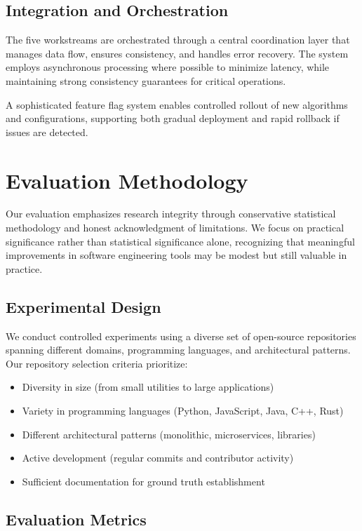 \documentclass[conference]{IEEEtran}
\begin{document}
\subsection{Integration and Orchestration}

The five workstreams are orchestrated through a central coordination layer that manages data flow, ensures consistency, and handles error recovery. The system employs asynchronous processing where possible to minimize latency, while maintaining strong consistency guarantees for critical operations.

A sophisticated feature flag system enables controlled rollout of new algorithms and configurations, supporting both gradual deployment and rapid rollback if issues are detected.

\section{Evaluation Methodology}

Our evaluation emphasizes research integrity through conservative statistical methodology and honest acknowledgment of limitations. We focus on practical significance rather than statistical significance alone, recognizing that meaningful improvements in software engineering tools may be modest but still valuable in practice.

\subsection{Experimental Design}

We conduct controlled experiments using a diverse set of open-source repositories spanning different domains, programming languages, and architectural patterns. Our repository selection criteria prioritize:

\begin{itemize}
\item Diversity in size (from small utilities to large applications)
\item Variety in programming languages (Python, JavaScript, Java, C++, Rust)
\item Different architectural patterns (monolithic, microservices, libraries)
\item Active development (regular commits and contributor activity)
\item Sufficient documentation for ground truth establishment
\end{itemize}

\subsection{Evaluation Metrics}
\end{document}
